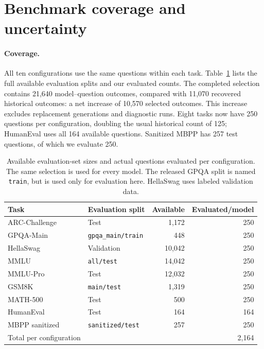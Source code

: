 \documentclass{article}
\begin{document}
\section{Benchmark coverage and uncertainty}
\label{app:benchmark-uncertainty}

\paragraph{Coverage.} All ten configurations use the same questions within each task. Table~\ref{tab:benchmark-coverage} lists the full available evaluation splits and our evaluated counts. The completed selection contains 21,640 model--question outcomes, compared with 11,070 recovered historical outcomes: a net increase of 10,570 selected outcomes. This increase excludes replacement generations and diagnostic runs. Eight tasks now have 250 questions per configuration, doubling the usual historical count of 125; HumanEval uses all 164 available questions. Sanitized MBPP has 257 test questions, of which we evaluate 250.

\begin{table}[ht]
\caption{Available evaluation-set sizes and actual questions evaluated per configuration. The same selection is used for every model. The released GPQA split is named \texttt{train}, but is used only for evaluation here. HellaSwag uses labeled validation data.}
\label{tab:benchmark-coverage}
\centering
\small
\begin{tabular}{llrr}
\toprule
Task & Evaluation split & Available & Evaluated/model \\
\midrule
ARC-Challenge & Test & 1,172 & 250 \\
GPQA-Main & \texttt{gpqa\_main/train} & 448 & 250 \\
HellaSwag & Validation & 10,042 & 250 \\
MMLU & \texttt{all/test} & 14,042 & 250 \\
MMLU-Pro & Test & 12,032 & 250 \\
GSM8K & \texttt{main/test} & 1,319 & 250 \\
MATH-500 & Test & 500 & 250 \\
HumanEval & Test & 164 & 164 \\
MBPP sanitized & \texttt{sanitized/test} & 257 & 250 \\
\midrule
Total per configuration & & & 2,164 \\
\bottomrule
\end{tabular}
\end{table}
\end{document}
